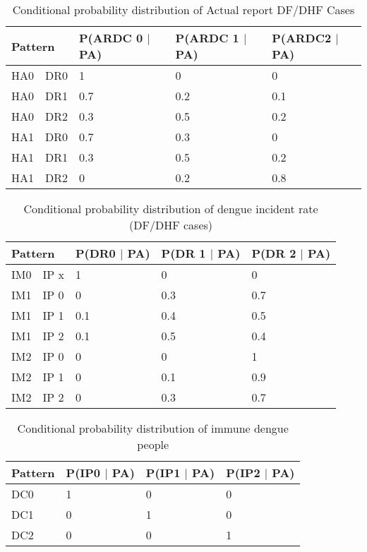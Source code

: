 \documentclass[a4paper,9pt,nil]{article}
\begin{document}
	\begin{table}[!htbp]
		\centering
		\normalsize
		\begin{tabular}{|l|l|l|l|l|}
			\hline
				\multicolumn{2}{|l|}{Pattern}  & P(ARDC 0 $\mid$ PA) & P(ARDC 1 $\mid$ PA) & P(ARDC2 $\mid$ PA)\\
			\hline
				HA0 & DR0 & 1 & 0 & 0\\
			\hline
				HA0 & DR1 & 0.7 & 0.2 & 0.1\\
			\hline
				HA0 & DR2 & 0.3 & 0.5 & 0.2\\
			\hline
				HA1 & DR0 & 0.7 & 0.3 & 0\\
			\hline
				HA1 & DR1 & 0.3 & 0.5 & 0.2\\
			\hline
				HA1 & DR2 & 0 & 0.2 & 0.8\\
			\hline
		\end{tabular}
		\caption{Conditional probability distribution of Actual report DF/DHF Cases}
	\end{table}
	
	\begin{table}[!htbp]
		\centering
		\normalsize
		\begin{tabular}{|l|l|l|l|l|}
			\hline
				\multicolumn{2}{|l|}{Pattern}   & P(DR0 $\mid$  PA) & P(DR 1 $\mid$  PA) & P(DR 2 $\mid$  PA)\\
			\hline
				IM0 & IP x & 1 & 0 & 0\\
			\hline
				IM1 & IP 0 & 0 & 0.3 & 0.7\\
			\hline
				IM1 & IP 1 & 0.1 & 0.4 & 0.5\\
			\hline
				IM1 & IP 2 & 0.1 & 0.5 & 0.4\\
			\hline
				IM2 & IP 0 & 0 & 0 & 1\\
			\hline
				IM2 & IP 1 & 0 & 0.1 & 0.9\\
			\hline
				IM2 & IP 2 & 0 & 0.3 & 0.7\\
			\hline
		\end{tabular}
		\caption{Conditional probability distribution of dengue incident rate (DF/DHF cases)}
	\end{table}
	
	\begin{table}[!htbp]
		\centering
		\normalsize
		\begin{tabular}{|l|l|l|l|}
			\hline
				Pattern & P(IP0 $\mid$ PA) & P(IP1 $\mid$ PA) & P(IP2 $\mid$ PA)\\
			\hline
				DC0 & 1 & 0 & 0\\
			\hline
				DC1 & 0 & 1 & 0\\
			\hline
				DC2 & 0 & 0 & 1\\
			\hline
		\end{tabular}
		\caption{Conditional probability distribution of immune dengue people}
	\end{table}
	
\end{document}
